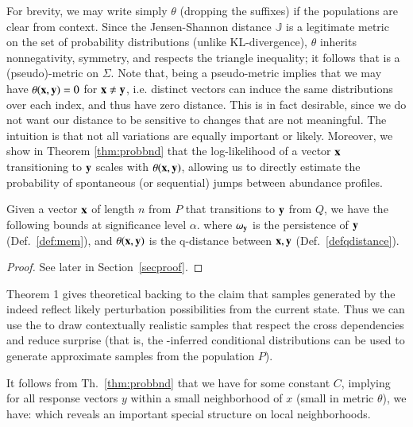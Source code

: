 \documentclass[onecolumn,10pt]{IEEEtran}
\begin{document}
For brevity, we may write simply $\theta$ (dropping the suffixes) if the populations are clear from context.  Since the Jensen-Shannon distance $\mathbb{J}$ is a legitimate metric~\cite{fuglede2004jensen} on the set of probability distributions (unlike KL-divergence), $\theta$ inherits nonnegativity, symmetry, and respects the triangle inequality; it follows that \qdist is a (pseudo)-metric on $\Sigma$. Note that, being a pseudo-metric implies that  we may have $\theta(\bm{\mathrm{x}}, \bm{\mathrm{y}}) = 0$ for $\bm{\mathrm{x}} \neq \bm{\mathrm{y}}$, i.e. distinct vectors can induce the same distributions over each index, and thus have zero distance. This is in fact desirable, since we do  not want  our distance to be sensitive to changes that are not meaningful.  The intuition is that not all variations are equally important or likely.    Moreover, we show in Theorem \ref{thm:probbnd} that the log-likelihood of a vector $\bm{\mathrm{x}}$ transitioning to $\bm{\mathrm{y}}$ scales with $\theta(\bm{\mathrm{x}},\bm{\mathrm{y}})$, allowing us to directly estimate the probability of spontaneous (or sequential) jumps between abundance profiles.

\begin{thm}\label{thm:probbnd}
  Given a vector $\bm{\mathrm{x}}$ of length $n$ from $P$ that transitions to $\bm{\mathrm{y}}$ from $Q$, we have the following bounds at significance level $\alpha$.
  where $\omega_{\bm{\mathrm{y}}}$ is the persistence of  $\bm{\mathrm{y}}$  (Def.~\ref{def:mem}), and $\theta(\bm{\mathrm{x}},\bm{\mathrm{y}})$ is the q-distance between $\bm{\mathrm{x}},\bm{\mathrm{y}}$ (Def.~\ref{defqdistance}).
\end{thm}

\begin{proof}
  See later in Section~\ref{secproof}.
\end{proof}

Theorem 1 gives theoretical backing to the claim that samples generated by the \qnet indeed reflect likely perturbation possibilities from the current state.  Thus we can use the \qnet to draw contextually realistic samples that respect the  cross dependencies and reduce surprise  (that is, the \qnet-inferred conditional distributions can be used to  generate approximate samples from the population $P$).  %

\begin{rem}\label{rem:neighborhood}
  It follows from Th.~\ref{thm:probbnd} that we have for some constant $C$,
  implying for all response vectors $y$ within a small neighborhood of $x$ (small in metric $\theta$), we
  have:
  which reveals an important special structure on local neighborhoods.
\end{rem}
\end{document}
